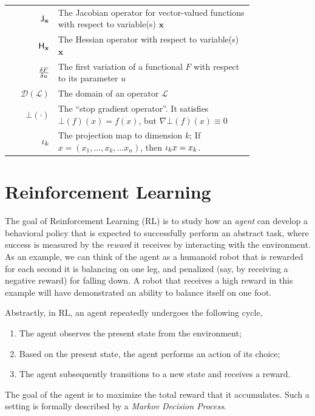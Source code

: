 {\begin{longtable}[h]{|r p{0.8\linewidth}|}
  $\mathsf{J}_{\mathbf{x}}$ & The Jacobian operator for vector-valued functions
  with respect to variable(s) $\mathbf{x}$\\
  $\mathsf{H}_{\mathbf{x}}$ & The Hessian operator with respect to
                           variable(s) $\mathbf{x}$\\
  $\frac{\delta F}{\delta u}$ & The first variation of a functional $F$
                            with respect to its parameter $u$\\
  $\mathscr{D}(\mathscr{L})$ & The domain of an operator $\mathscr{L}$\\
  $\bot(\cdot)$ & The ``stop gradient operator''. It satisfies
                  $\bot(f)(x)=f(x)$, but $\nabla\bot(f)(x)\equiv 0$\\
  $\iota_{k}$ & The projection map to dimension $k$; If $x=(x_1,\dots,
               x_k,\dots x_n)$, then $\iota_{k}x=x_k$.\\\hline
\end{longtable}%
}

\section{Reinforcement Learning}
The goal of Reinforcement Learning (RL) is to study how an
\emph{agent} can develop a behavioral policy that is expected to
successfully perform an abstract task, where success is measured by
the \emph{reward} it receives by interacting with the environment. As
an example, we can think of the agent as a humanoid robot that is
rewarded for each second it is balancing on one leg, and penalized
(say, by receiving a negative reward) for falling down. A robot that
receives a high reward in this example will have demonstrated an
ability to balance itself on one foot.

Abstractly, in RL, an agent repeatedly undergoes the following cycle,

\begin{enumerate}
\item The agent observes the present state from the environment;
\item Based on the present state, the agent performs an action of its choice;
\item The agent subsequently transitions to a new state and receives a reward.
\end{enumerate}

The goal of the agent is to maximize the total reward that it
accumulates. Such a setting is formally
described by a \emph{Markov Decision Process}.

